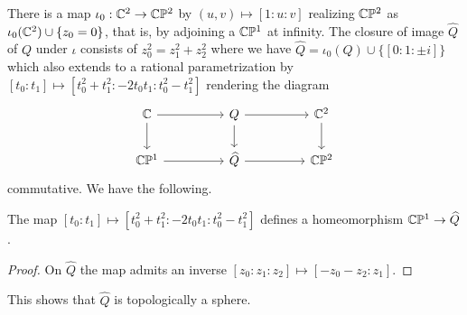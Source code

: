There is a map $\iota_{0}:\mathbb{C}^{2}\to\mathbb{C}\mathbb{P}^{2}$ by $(u,v)\mapsto[1:u:v]$ realizing $\mathbb{C}\mathbb{P}^{2}$ as $\iota_{0}(\mathbb{C}^{2})\cup\{z_{0}=0\}$, that is, by adjoining a $\mathbb{C}\mathbb{P}^{1}$ at infinity. The closure of image $\widehat{Q}$ of $Q$ under $\iota$ consists of $z_{0}^{2}=z_{1}^{2}+z_{2}^{2}$ where we have $\widehat{Q}=\iota_{0}(Q)\cup\{[0:1:\pm i]\}$ which also extends to a rational parametrization by $[t_{0}:t_{1}]\mapsto[t_{0}^{2}+t_{1}^{2}:-2t_{0}t_{1}:t_{0}^{2}-t_{1}^{2}]$ rendering the diagram 
$$%
\begin{tikzcd}
	\CC && Q && {\CC^{2}} \\
	{\CC\PP^{1}} && {\widehat{Q}} && {\CC\PP^{2}}
	\arrow[from=1-1, to=1-3]
	\arrow[from=1-1, to=2-1]
	\arrow[from=1-3, to=1-5]
	\arrow[from=1-3, to=2-3]
	\arrow[from=1-5, to=2-5]
	\arrow[from=2-1, to=2-3]
	\arrow[from=2-3, to=2-5]
\end{tikzcd}$$
commutative. We have the following. 
\begin{proposition}\label{prop: compactified quadric is homeomorphic to P1}
    The map $[t_{0}:t_{1}]\mapsto[t_{0}^{2}+t_{1}^{2}:-2t_{0}t_{1}:t_{0}^{2}-t_{1}^{2}]$ defines a homeomorphism $\mathbb{C}\mathbb{P}^{1}\to\widehat{Q}$.
\end{proposition}
\begin{proof}
    On $\widehat{Q}$ the map admits an inverse $[z_{0}:z_{1}:z_{2}]\mapsto [-z_{0}-z_{2}:z_{1}]$.  
\end{proof}
This shows that $\widehat{Q}$ is topologically a sphere. 

